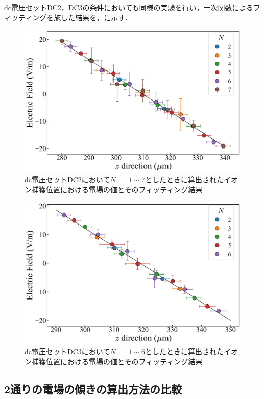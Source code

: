 dc電圧セットDC2，DC3の条件においても同様の実験を行い，一次関数によるフィッティングを施した結果を，に示す．

\begin{figure}[h]
	\begin{center}
		\includegraphics[width = 0.6\linewidth]{./results/figure/DC2_E.jpg}
		\caption{dc電圧セットDC2において$N \ = \ 1 \sim 7$としたときに算出されたイオン捕獲位置における電場の値とそのフィッティング結果}
		\label{fig:DC2_E}
	\end{center}
\end{figure}

\begin{figure}[h]
	\begin{center}
		\includegraphics[width = 0.6\linewidth]{./results/figure/DC3_E.jpg}
		\caption{dc電圧セットDC3において$N \ = \ 1 \sim 6$としたときに算出されたイオン捕獲位置における電場の値とそのフィッティング結果}
		\label{fig:DC3_E}
	\end{center}
\end{figure}
%
\clearpage
%
\subsection{2通りの電場の傾きの算出方法の比較}

